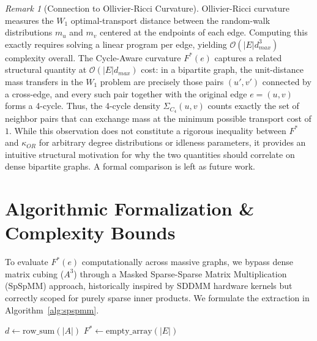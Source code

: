 \documentclass{siuro250211}
\theoremstyle{remark}
\newtheorem{remark}{Remark}
\theoremstyle{plain}
\begin{document}
\begin{remark}[Connection to Ollivier-Ricci Curvature]
Ollivier-Ricci curvature \cite{ollivier2009ricci} measures the $W_1$ optimal-transport distance between the random-walk distributions $m_u$ and $m_v$ centered at the endpoints of each edge. Computing this exactly requires solving a linear program per edge, yielding $\mathcal{O}(|E|d_{max}^3)$ complexity overall. The Cycle-Aware curvature $F^*(e)$ captures a related structural quantity at $\mathcal{O}(|E|d_{max})$ cost: in a bipartite graph, the unit-distance mass transfers in the $W_1$ problem are precisely those pairs $(u', v')$ connected by a cross-edge, and every such pair together with the original edge $e=(u,v)$ forms a 4-cycle. Thus, the 4-cycle density $\Sigma_{C_4}(u,v)$ counts exactly the set of neighbor pairs that can exchange mass at the minimum possible transport cost of $1$. While this observation does not constitute a rigorous inequality between $F^*$ and $\kappa_{OR}$ for arbitrary degree distributions or idleness parameters, it provides an intuitive structural motivation for why the two quantities should correlate on dense bipartite graphs. A formal comparison is left as future work.
\end{remark}

\section{Algorithmic Formalization \& Complexity Bounds}

To evaluate $F^*(e)$ computationally across massive graphs, we bypass dense matrix cubing ($A^3$) through a Masked Sparse-Sparse Matrix Multiplication (SpSpMM) approach, historically inspired by SDDMM hardware kernels but correctly scoped for purely sparse inner products. We formulate the extraction in Algorithm~\ref{alg:spspmm}.

\begin{algorithm2e}[htbp]
\caption{Sparse $C_4$ Bipartite Edge Extraction via Masked SpSpMM}
\label{alg:spspmm}
\SetAlgoLined
{}
$d \gets \text{row\_sum}(|A|)$\;
$F^* \gets \text{empty\_array}(|E|)$\;
\end{algorithm2e}
\end{document}
